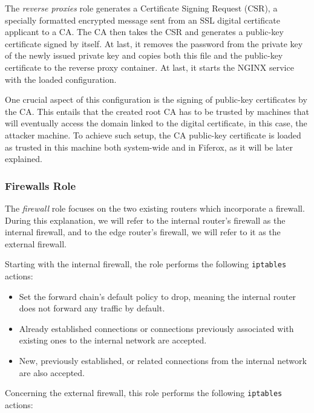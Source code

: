 The \textit{reverse proxies} role generates a Certificate Signing Request (CSR), a specially formatted encrypted message sent from an SSL digital certificate applicant to a CA. The CA then takes the CSR and generates a public-key certificate signed by itself. At last, it removes the password from the private key of the newly issued private key and copies both this file and the public-key certificate to the reverse proxy container. At last, it starts the NGINX service with the loaded configuration. 

One crucial aspect of this configuration is the signing of public-key certificates by the CA. This entails that the created root CA has to be trusted by machines that will eventually access the domain linked to the digital certificate, in this case, the attacker machine. To achieve such setup, the CA public-key certificate is loaded as trusted in this machine both system-wide and in Fiferox, as it will be later explained.

\subsubsection{Firewalls Role} \label{sec:ansible_firewalls_role}

The \textit{firewall} role focuses on the two existing routers which incorporate a firewall. During this explanation, we will refer to the internal router's firewall as the internal firewall, and to the edge router's firewall, we will refer to it as the external firewall. 

Starting with the internal firewall, the role performs the following \texttt{iptables} actions:

\begin{itemize}
    \item Set the forward chain's default policy to drop, meaning the internal router does not forward any traffic by default.
    \item Already established connections or connections previously associated with existing ones to the internal network are accepted.
    \item New, previously established, or related connections from the internal network are also accepted.
\end{itemize}

Concerning the external firewall, this role performs the following \texttt{iptables} actions:

